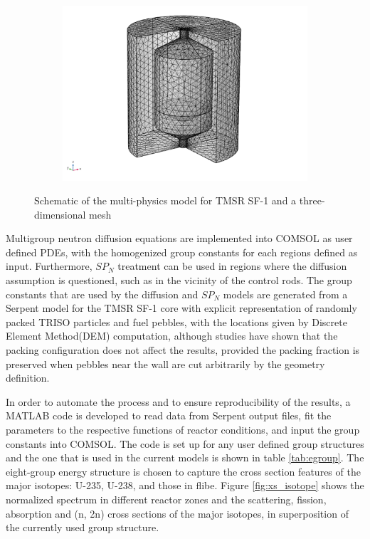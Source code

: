\documentclass{elsarticle}
\begin{document}
\begin{figure}[h]
\begin{subfigure}{0.2\textwidth}
  \end{subfigure}
  ~
  \begin{subfigure}{0.55\textwidth}
    \includegraphics[width = \columnwidth]{./images/diffusion/tmsr/finer.png}
  \end{subfigure}
  \caption{Schematic of the multi-physics model for TMSR SF-1 and a three-dimensional mesh}
  \label{fig:model_geom}
\end{figure}

Multigroup neutron diffusion equations are implemented into COMSOL as user defined PDEs, with the homogenized group constants for each regions defined as input. Furthermore, $SP_N$ treatment can be used in regions where the diffusion assumption is questioned, such as in the vicinity of the control rods.
The group constants that are used by the diffusion and $SP_N$ models are generated from a Serpent model for the TMSR SF-1 core with explicit representation of randomly packed TRISO particles and fuel pebbles, with the locations given by Discrete Element Method(DEM) computation, although studies\cite{Fratoni2007} have shown that the packing configuration does not affect the results, provided the packing fraction is preserved when pebbles near the wall are cut arbitrarily by the geometry definition. 

In order to automate the process and to ensure reproducibility of the results, a MATLAB code is developed to read data from Serpent output files, fit the parameters to the respective functions of reactor conditions, and input the group constants into COMSOL. The code is set up for any user defined group structures and the one that is used in the current models is shown in table \ref{tab:egroup}. The eight-group energy structure is chosen to capture the cross section features of the major isotopes: U-235, U-238, and those in flibe. Figure \ref{fig:xs_isotope} shows the normalized spectrum in different reactor zones and the scattering, fission, absorption and (n, 2n) cross sections of the major isotopes, in superposition of the currently used group structure. 
\end{document}
